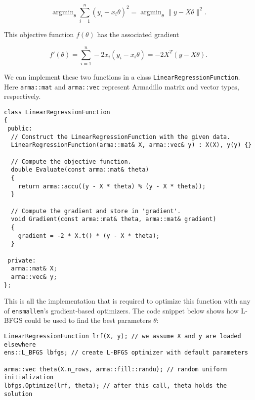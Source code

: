 \documentclass{article}
\begin{document}
\begin{equation}
\operatorname{argmin}_\theta \sum_{i = 1}^n (y_i - x_i \theta)^2 =
\operatorname{argmin}_\theta \| y - X \theta \|^2.
\end{equation}

This objective function $f(\theta)$ has the associated gradient

\begin{equation}
f'(\theta) = \sum_{i = 1}^n -2 x_i (y_i - x_i \theta) = -2 X^T (y - X \theta).
\end{equation}

We can implement these two functions in a class {\tt LinearRegressionFunction}.
Here {\tt arma::mat} and {\tt arma::vec} represent Armadillo matrix and vector
types, respectively. %

\begin{verbatim}
class LinearRegressionFunction
{
 public:
  // Construct the LinearRegressionFunction with the given data.
  LinearRegressionFunction(arma::mat& X, arma::vec& y) : X(X), y(y) {}

  // Compute the objective function.
  double Evaluate(const arma::mat& theta)
  {
    return arma::accu((y - X * theta) % (y - X * theta));
  }

  // Compute the gradient and store in 'gradient'.
  void Gradient(const arma::mat& theta, arma::mat& gradient)
  {
    gradient = -2 * X.t() * (y - X * theta);
  }

 private:
  arma::mat& X;
  arma::vec& y;
};
\end{verbatim}

This is all the implementation that is required to optimize this function with
any of {\tt ensmallen}'s gradient-based optimizers.  The code snippet below
shows how L-BFGS could be used to find the best parameters $\theta$:

\begin{verbatim}
LinearRegressionFunction lrf(X, y); // we assume X and y are loaded elsewhere
ens::L_BFGS lbfgs; // create L-BFGS optimizer with default parameters

arma::vec theta(X.n_rows, arma::fill::randu); // random uniform initialization
lbfgs.Optimize(lrf, theta); // after this call, theta holds the solution
\end{verbatim}

\end{document}
